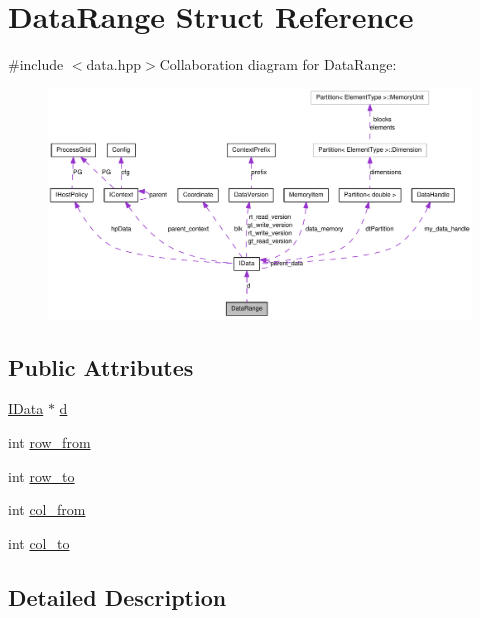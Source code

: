 \hypertarget{struct_data_range}{
\section{DataRange Struct Reference}
\label{struct_data_range}
}


{\ttfamily \#include $<$data.hpp$>$}Collaboration diagram for DataRange:\nopagebreak
\begin{figure}[H]
\begin{center}
\leavevmode
\includegraphics[width=400pt]{struct_data_range__coll__graph}
\end{center}
\end{figure}
\subsection*{Public Attributes}
\begin{DoxyCompactItemize}
\item 
\hyperlink{class_i_data}{IData} $\ast$ \hyperlink{struct_data_range_a50c6aff4cba6396786730dbf71ea606e}{d}
\item 
int \hyperlink{struct_data_range_a5afb680f6208ef6f7268d824dfd1acdf}{row\_\-from}
\item 
int \hyperlink{struct_data_range_ac696d8155ade63bcb137163efa4eaad6}{row\_\-to}
\item 
int \hyperlink{struct_data_range_a0aa3fad400201762e729b5899e916de7}{col\_\-from}
\item 
int \hyperlink{struct_data_range_a7972ade60d7e0b41e840b4f1719156eb}{col\_\-to}
\end{DoxyCompactItemize}


\subsection{Detailed Description}


